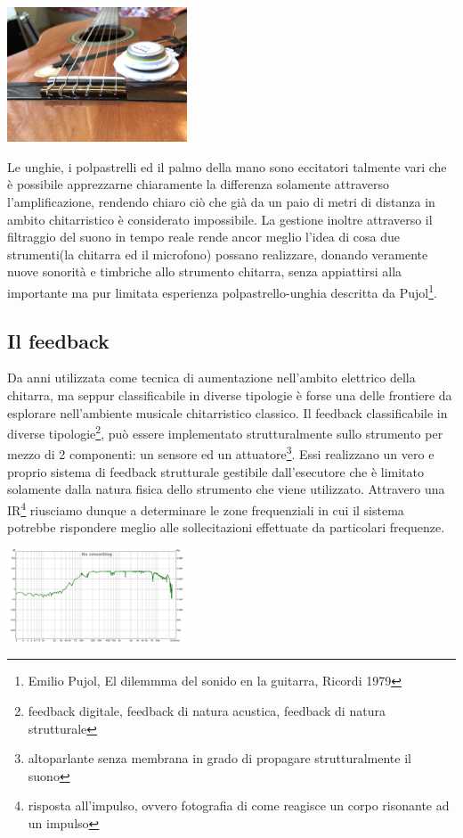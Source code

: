 \documentclass[oneside]{article}
\begin{document}
\begin{multicols*}{2}
\includegraphics[width=0.4\textwidth]{img/chit.jpg}

Le unghie, i polpastrelli ed il palmo della mano sono eccitatori talmente vari che è possibile apprezzarne chiaramente la differenza solamente attraverso l'amplificazione, rendendo chiaro ciò che già da un paio di metri di distanza in ambito chitarristico è considerato impossibile. La gestione inoltre attraverso il filtraggio del suono in tempo reale rende ancor meglio l'idea di cosa due strumenti(la chitarra ed il microfono) possano realizzare, donando veramente nuove sonorità e timbriche allo strumento chitarra, senza appiattirsi alla importante ma pur limitata esperienza polpastrello-unghia descritta da Pujol\footnote{Emilio Pujol, El dilemmma del sonido en la guitarra, Ricordi 1979}.

\subsection{Il feedback} 
Da anni utilizzata come tecnica di aumentazione nell'ambito elettrico della chitarra, ma seppur classificabile in diverse tipologie è forse una delle frontiere da esplorare nell'ambiente musicale chitarristico classico. Il feedback classificabile in diverse tipologie\footnote{feedback digitale, feedback di natura acustica, feedback di natura strutturale}, può essere implementato strutturalmente sullo strumento per mezzo di 2 componenti: un sensore ed un attuatore\footnote{altoparlante senza membrana in grado di propagare strutturalmente il suono}. Essi realizzano un vero e proprio sistema di feedback strutturale gestibile dall'esecutore che è limitato solamente dalla natura fisica dello strumento che viene utilizzato. Attravero una IR\footnote{risposta all’impulso, ovvero fotografia di come reagisce un corpo risonante ad un impulso} riusciamo dunque a determinare le zone frequenziali in cui il sistema potrebbe rispondere meglio alle sollecitazioni effettuate da particolari frequenze.
\newline

\includegraphics[width=0.4\textwidth]{img/ir.png}


\end{multicols*}
\end{document}
